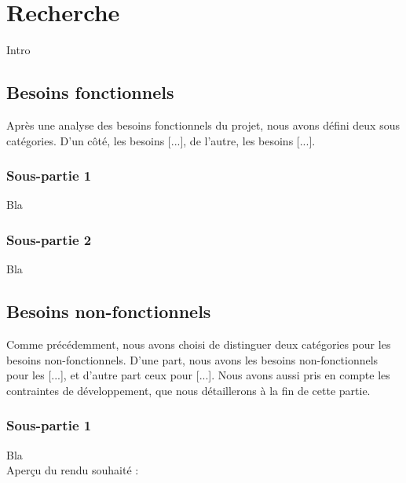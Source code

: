 \chapter{Recherche}

Intro

\section{Besoins fonctionnels}

Après une analyse des besoins fonctionnels du projet, nous avons défini deux sous catégories. D'un côté, les besoins [...], de l'autre, les besoins [...].

\subsection{Sous-partie 1}

Bla

\subsection{Sous-partie 2}

Bla

\newpage

\section{Besoins non-fonctionnels}

Comme précédemment, nous avons choisi de distinguer deux catégories pour les besoins non-fonctionnels. D'une part, nous avons les besoins non-fonctionnels pour les [...], et d'autre part ceux pour [...]. Nous avons aussi pris en compte les contraintes de développement, que nous détaillerons à la fin de cette partie.

\subsection{Sous-partie 1}

Bla\\

Aperçu du rendu souhaité :

